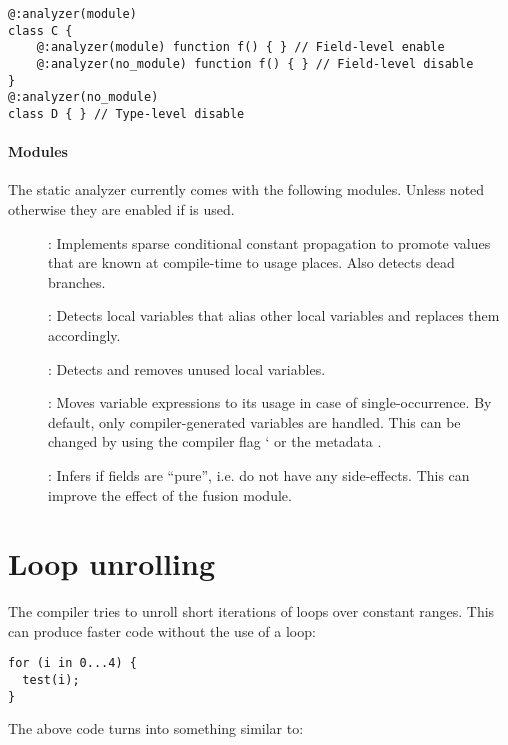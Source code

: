 \begin{lstlisting}
@:analyzer(module)
class C {
    @:analyzer(module) function f() { } // Field-level enable
    @:analyzer(no_module) function f() { } // Field-level disable
}
@:analyzer(no_module)
class D { } // Type-level disable
\end{lstlisting}

\paragraph{Modules}
\label{cr-static-analyzer-modules}

The static analyzer currently comes with the following modules. Unless noted otherwise they are enabled if  is used.

\begin{description}
\item[]: Implements sparse conditional constant propagation to promote values that are known at compile-time to usage places. Also detects dead branches.
\item[]: Detects local variables that alias other local variables and replaces them accordingly.
\item[]: Detects and removes unused local variables.
\item[]: Moves variable expressions to its usage in case of single-occurrence. By default, only compiler-generated variables are handled. This can be changed by using the compiler flag ` or the metadata .
\item[]: Infers if fields are ``pure'', i.e. do not have any side-effects. This can improve the effect of the fusion module.
\end{description}


\section{Loop unrolling}
\label{cr-loop-unrolling}

The compiler tries to unroll short iterations of  loops over constant ranges. This can produce faster code without the use of a loop:

\begin{lstlisting}
for (i in 0...4) {
  test(i);
}
\end{lstlisting}

The above code turns into something similar to:

